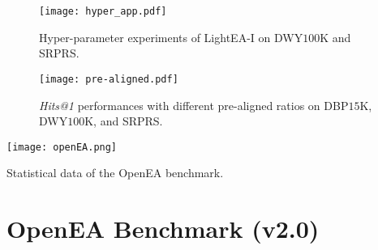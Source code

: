 \documentclass[11pt]{article}
\begin{document}
\begin{figure*}[t]
    \centering
    \texttt{[image: hyper\_app.pdf]}
    \caption{Hyper-parameter experiments of LightEA-I on DWY$100$K and SRPRS.}
    \label{fig:hyperapp}
\end{figure*}

\begin{figure*}[t]
    \centering
    \texttt{[image: pre-aligned.pdf]}
    \caption{\emph{Hits@1} performances with different pre-aligned ratios on DBP$15$K, DWY$100$K, and SRPRS.}
    \label{fig:pre-aligned}
\end{figure*}

\begin{table*}[t]
    \centering
    \texttt{[image: openEA.png]}
    \caption{Statistical data of the OpenEA benchmark.}
    \label{table:openea}
\end{table*}

\clearpage
\clearpage

\section{OpenEA Benchmark (v2.0)}
\label{sec:openEA}
\end{document}
